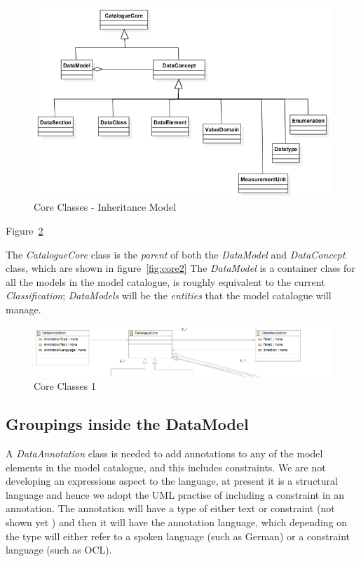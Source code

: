 \documentclass{article}
\begin{document}
 \begin{figure}[here]
\includegraphics[scale=0.4]{images/inheritance}
\caption{Core Classes - Inheritance Model} 
\label{fig:inheritance}
\end{figure}

Figure~\ref{fig:core1} 



The \emph{CatalogueCore} class is the \emph{parent} of both the \emph{DataModel} and \emph{DataConcept} class, which are shown in figure~\ref{fig:core2} The \emph{DataModel} is a container class for all the models in the model catalogue, is roughly equivalent to the current \emph{Classification};  \emph{DataModels} will be the \emph{entities} that the model catalogue will manage.

 \begin{figure}[here]
\includegraphics[scale=0.4]{images/core1}
\caption{Core Classes 1} 
\label{fig:core1}
\end{figure}

\subsection{Groupings inside the DataModel}

A \emph{DataAnnotation} class is needed to add annotations to any of the model elements in the model catalogue, and this includes constraints. We are not developing an expressions aspect to the language, at present it is a structural language and hence we adopt the UML practise of including a constraint in an annotation. The annotation will have a type of either text or constraint (not shown yet ) and then it will have the annotation language, which depending on the type will either refer to a spoken language (such as German) or a constraint language (such as OCL).
\end{document}
